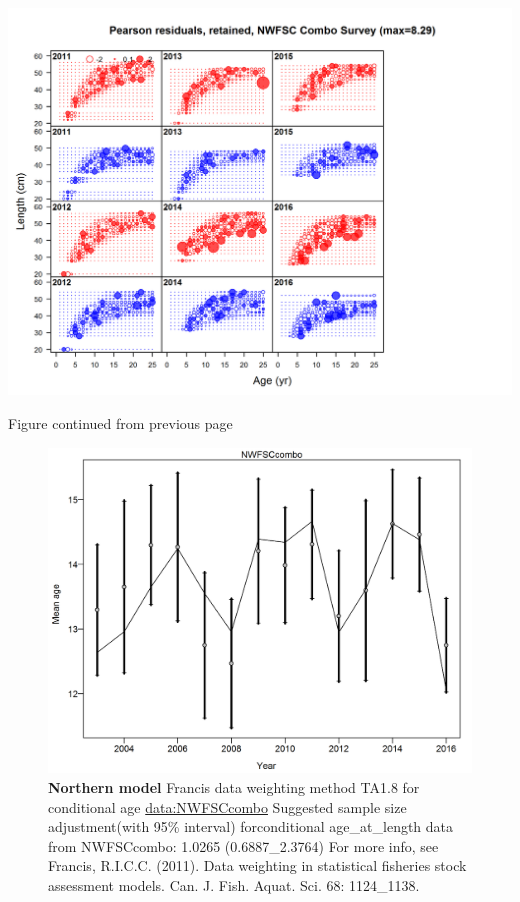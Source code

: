 \documentclass[12pt,]{article}
\begin{document}
\includegraphics{./r4ss/plots_mod1/comp_condAALfit_residsflt6mkt2_page2.png}

\begin{center} 

            Figure continued from previous page 

            \end{center}

\begin{figure}[htbp]
\centering
\includegraphics{./r4ss/plots_mod1/comp_condAALfit_data_weighting_TA1.8_condAgeNWFSCcombo.png}
\caption{\textbf{Northern model} Francis data weighting method TA1.8 for
conditional age \url{data:NWFSCcombo} Suggested sample size
adjustment(with 95\% interval) forconditional age\_at\_length data from
NWFSCcombo: 1.0265 (0.6887\_2.3764) For more info, see Francis, R.I.C.C.
(2011). Data weighting in statistical fisheries stock assessment models.
Can. J. Fish. Aquat. Sci. 68: 1124\_1138.
\label{fig:mod1_3_comp_condAALfit_data_weighting_TA1.8_condAgeNWFSCcombo}}
\end{figure}
\end{document}
